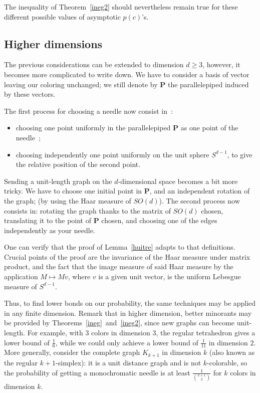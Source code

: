 \documentclass[a4paper,11pt]{article}
\theoremstyle{definition}
\theoremstyle{remark}
\begin{document}
The inequality of Theorem~\ref{ineg2} should nevertheless remain true for these different possible values of asymptotic $p(c)$'s.

\subsection{Higher dimensions}
\label{dim}
The previous considerations can be extended to dimension $d \geq 3$, however, 
it becomes more complicated to write down. We have to consider a basis of 
vector leaving our coloring unchanged; we still denote by $\mathbf{P}$ the 
parallelepiped induced by these vectors.

The first process for choosing a needle now consist in~: 
\begin{itemize}
	\item choosing one point uniformly in the parallelepiped $ \mathbf{P} $ as 
	one point of the needle~;
	\item choosing independently one point uniformly on the unit sphere 
	$S^{d-1}$, to give the relative position of the second point.
\end{itemize}

Sending a unit-length graph on the $d$-dimensional space becomes a bit more 
tricky. We have to choose one initial point in $ \mathbf{P} $, and an independent 
rotation of the graph; (by using the Haar measure of $SO(d)$). The second process now consists 
in: rotating the graph thanks to the matrix of $SO(d)$ chosen, translating it 
to the point of $\mathbf{P}$ chosen, and choosing one of the 
edges independently as your needle.

One can verify that the proof of Lemma~\ref{huitre} adapts to that definitions. 
Crucial 
points of the proof are the invariance of the Haar measure under matrix product, and the 
fact that the image measure of said Haar measure by the application 
$M\mapsto Mv$, where $v$ is a given unit vector, is the uniform Lebesgue 
measure of $S^{d-1}$.

Thus, to find lower bonds on our probability, the same techniques may be applied 
in any finite dimension.
%
Remark that in higher dimension, better minorants may be provided by 
Theorems~\ref{ineg}~and~\ref{ineg2}, since new graphs can 
become unit-length. For example, with $3$ colors in dimension $3$, the regular 
tetrahedron gives a lower bound 
of $\frac 1 6$, while we could only achieve a lower bound of $\frac 1 {11}$ in dimension $2$. More generally, consider the complete graph 
$K_{k+1}$ in dimension $k$ (also known as the regular $k+1$-simplex): it is a unit distance graph and is not $k$-colorable, so the 
probability of getting a monochromatic needle is at least $\frac{1}{\binom{k+1}{2}}$ 
for $k$ colors in dimension $k$.
\end{document}
